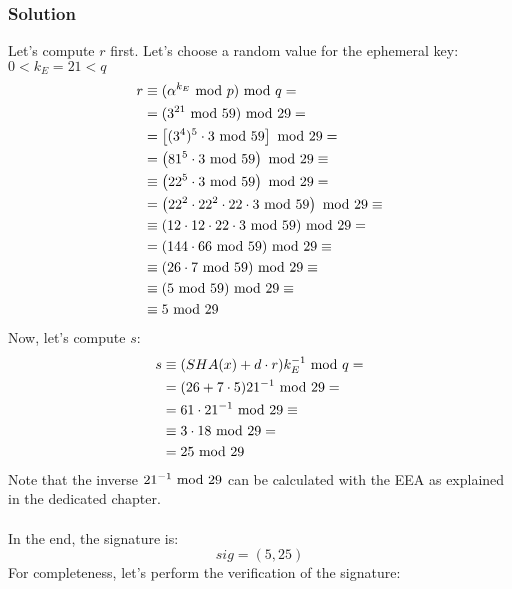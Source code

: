 \subsubsection*{Solution}
Let's compute $r$ first. Let's choose a random value for the ephemeral key: $0<k_E=21<q$
\begin{align*}
    r&\equiv(\alpha^{k_E}\text{ mod } p)\text{ mod } q=\\
    &=(3^{21}\text{ mod }59)\text{ mod }29=\\
    &=\left[(3^4)^5\cdot3\text{ mod }59\right]\text{ mod }29=\\
    &=\left(81^5\cdot3\text{ mod }59\right)\text{ mod }29\equiv\\
    &\equiv\left(22^5\cdot3\text{ mod }59\right)\text{ mod }29=\\
    &=\left(22^2\cdot22^2\cdot22\cdot3\text{ mod }59\right)\text{ mod }29\equiv\\
    &\equiv(12\cdot12\cdot22\cdot3\text{ mod }59)\text{ mod }29=\\
    &=(144\cdot66\text{ mod }59)\text{ mod }29\equiv\\
    &\equiv(26\cdot7\text{ mod }59)\text{ mod }29\equiv\\
    &\equiv(5\text{ mod }59)\text{ mod }29\equiv\\
    &\equiv5\text{ mod }29
\end{align*}
Now, let's compute $s$:
\begin{align*}
    s&\equiv(SHA(x)+d\cdot r)k_E^{-1}\text{ mod } q=\\
    &=(26+7\cdot5)21^{-1}\text{ mod }29=\\
    &=61\cdot21^{-1}\text{ mod }29\equiv\\
    &\equiv3\cdot18\text{ mod }29=\\
    &=25\text{ mod }29
\end{align*}
Note that the inverse $21^{-1}\text{ mod }29$ can be calculated with the EEA as explained in the dedicated chapter.\\\\
In the end, the signature is:
$$sig=(5,25)$$
For completeness, let's perform the verification of the signature:

